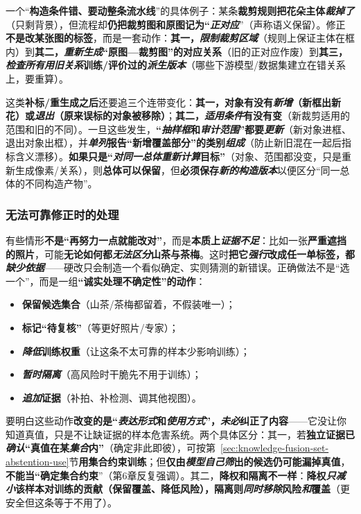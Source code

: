 一个“\textbf{构造条件错、要动整条流水线}”的具体例子：某条\textbf{裁剪规则把花朵主体\emph{裁掉了}}（只剩背景），但流程却\textbf{仍把裁剪图和原图记为“\emph{正对应}}”（声称语义保留）。修正\textbf{不是改某张图的标签}，而是一套动作：\textbf{其一，\emph{限制裁剪区域}}（规则上保证主体在框内）到\textbf{其二，\emph{重新生成}“原图—裁剪图”的对应关系}（旧的正对应作废）到\textbf{其三，\emph{检查所有用旧关系}训练/评价过的\emph{派生版本}}（哪些下游模型/数据集建立在错关系上，要重算）。

这类\textbf{补标/重生成之后}还要追三个连带变化：\textbf{其一，对象有没有\emph{新增}（新框出新花）或\emph{退出}（原来误标的对象被移除）}；\textbf{其二，\emph{适用条件}有没有变}（新裁剪适用的范围和旧的不同）。一旦这些发生，\textbf{“\emph{抽样框}和\emph{审计范围}”都要\emph{更新}}（新对象进框、退出对象出框），并\textbf{\emph{单列}报告“新增覆盖部分”的类别\emph{组成}}（防止新旧混在一起后指标含义漂移）。\textbf{如果只是“\emph{对同一总体}\emph{重新计算}目标”}（对象、范围都没变，只是重新生成像素/关系），则\textbf{总体可以保留}，但\textbf{必须保存\emph{新的构造版本}}以便区分“同一总体的不同构造产物”。

\subsubsection{无法可靠修正时的处理}
\label{sec:knowledge-quality-assessment-correction-unresolved}

有些情形\textbf{不是“再努力一点就能改对”}，而是\textbf{本质上\emph{证据不足}}：比如一张\textbf{严重遮挡的照片}，可能\textbf{无论如何都\emph{无法区分}山茶与茶梅}。这时\textbf{把它\emph{强行}改成任一单标签，都\emph{缺少依据}}——硬改只会制造一个看似确定、实则猜测的新错误。正确做法不是“选一个”，而是一组\textbf{“诚实处理不确定性”的动作}：
\begin{itemize}\item \textbf{保留候选集合}（山茶/茶梅都留着，不假装唯一）；\item \textbf{标记“待复核”}（等更好照片/专家）；\item \textbf{\emph{降低}训练权重}（让这条不太可靠的样本少影响训练）；\item \textbf{\emph{暂时隔离}}（高风险时干脆先不用于训练）；\item \textbf{\emph{追加}证据}（补拍、补检测、调其他视图）。\end{itemize}
要明白这些动作\textbf{改变的是“\emph{表达形式}和\emph{使用方式}”，\emph{未必}纠正了内容}——它没让你知道真值，只是不让缺证据的样本危害系统。两个具体区分：其一，若\textbf{独立证据已\emph{确认}“真值在某\emph{集合}内”}（确定非此即彼），可按第~\ref{sec:knowledge-fusion-set-abstention-use}节\textbf{用集合约束训练}；但\textbf{仅由\emph{模型自己筛}出的候选}\textbf{仍可能漏掉真值}，\textbf{不能当“确定集合约束}”（第6章反复强调）。其二，\textbf{降权和隔离不一样}：\textbf{降权\emph{只减小}该样本对训练的贡献（保留覆盖、降低风险），隔离则\emph{同时移除}风险\emph{和}覆盖}（更安全但这条等于不用了）。

